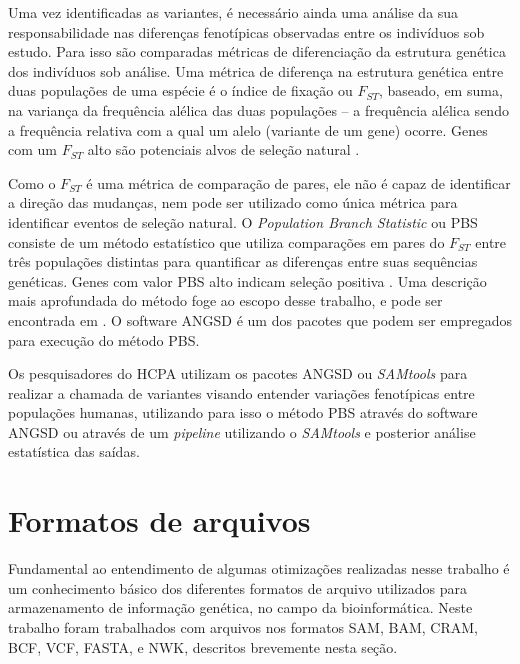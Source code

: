 \documentclass[cic,tc]{iiufrgs}
\begin{document}
Uma vez identificadas as variantes, é necessário ainda uma análise da sua
responsabilidade nas diferenças fenotípicas observadas entre os indivíduos sob
estudo. Para isso são comparadas métricas de diferenciação da estrutura
genética dos indivíduos sob análise. Uma métrica de diferença na estrutura
genética entre duas populações de uma espécie é o índice de fixação ou
$F_{ST}$, baseado, em suma, na variança da frequência alélica das duas
populações -- a frequência alélica sendo a frequência relativa com a qual um
alelo (variante de um gene) ocorre. Genes com um $F_{ST}$ alto são potenciais
alvos de seleção natural \cite{yi2010sequencing}.

Como o $F_{ST}$ é uma métrica de comparação de pares, ele não é capaz de
identificar a direção das mudanças, nem pode ser utilizado como única métrica
para identificar eventos de seleção natural. O \textit{Population Branch
Statistic} ou PBS consiste de um método estatístico que utiliza comparações em
pares do $F_{ST}$ entre três populações distintas para quantificar as
diferenças entre suas sequências genéticas. Genes com valor PBS alto indicam
seleção positiva \cite{jiang2019population}. Uma descrição mais aprofundada do
método foge ao escopo desse trabalho, e pode ser encontrada em
\cite{yi2010sequencing}. O software ANGSD é um dos pacotes que podem ser
empregados para execução do método PBS.

Os pesquisadores do HCPA utilizam os pacotes ANGSD ou \textit{SAMtools} para realizar a
chamada de variantes visando entender variações fenotípicas entre populações
humanas, utilizando para isso o método PBS através do software ANGSD ou através
de um \textit{pipeline} utilizando o \textit{SAMtools} e posterior análise estatística das
saídas.

\section{Formatos de arquivos}
\label{sec:formats}


Fundamental ao entendimento de algumas otimizações realizadas nesse trabalho é
um conhecimento básico dos diferentes formatos de arquivo utilizados para
armazenamento de informação genética, no campo da bioinformática. Neste
trabalho foram trabalhados com arquivos nos formatos SAM, BAM, CRAM, BCF, VCF,
FASTA, e NWK, descritos brevemente nesta seção.
\end{document}
